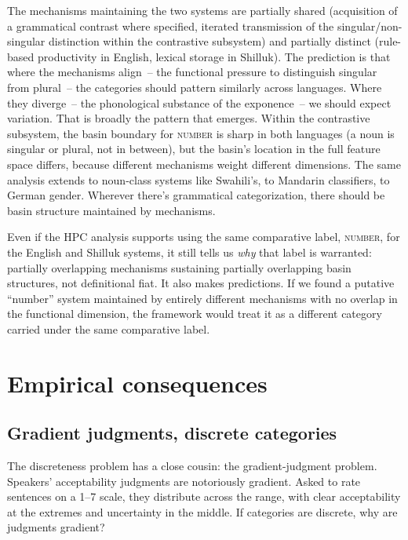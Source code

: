 The mechanisms maintaining the two systems are partially shared (acquisition of a grammatical contrast where specified, iterated transmission of the singular/non-singular distinction within the contrastive subsystem) and partially distinct (rule-based productivity in English, lexical storage in Shilluk). The prediction is that where the mechanisms align~-- the functional pressure to distinguish singular from plural~-- the categories should pattern similarly across languages. Where they diverge~-- the phonological substance of the exponence~-- we should expect variation. That is broadly the pattern that emerges. Within the contrastive subsystem, the basin boundary for \textsc{number} is sharp in both languages (a noun is singular or plural, not in between), but the basin's location in the full feature space differs, because different mechanisms weight different dimensions. The same analysis extends to noun-class systems like Swahili's, to Mandarin classifiers, to German gender. Wherever there's grammatical categorization, there should be basin structure maintained by mechanisms.

Even if the HPC analysis supports using the same comparative label, \textsc{number}, for the English and Shilluk systems, it still tells us \emph{why} that label is warranted: partially overlapping mechanisms sustaining partially overlapping basin structures, not definitional fiat. It also makes predictions. If we found a putative \enquote{number} system maintained by entirely different mechanisms with no overlap in the functional dimension, the framework would treat it as a different category carried under the same comparative label.

\section{Empirical consequences}
\label{sec:5:empirical-consequences}

\subsection{Gradient judgments, discrete categories}
\label{subsec:5:gradient-discrete}

The discreteness problem has a close cousin: the gradient-judgment problem. Speakers' acceptability judgments are notoriously gradient. Asked to rate sentences on a 1--7 scale, they distribute across the range, with clear acceptability at the extremes and uncertainty in the middle. If categories are discrete, why are judgments gradient?

